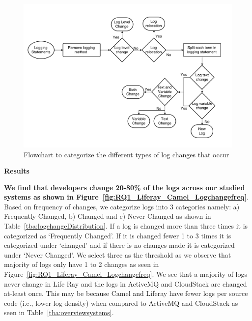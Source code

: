 \begin{figure}[tb]
	\centering
	\includegraphics[width=0.75\linewidth]{Flowchart2}
	\caption{Flowchart to categorize the different types of log changes that occur}
	\label{fig:Flowchart2}
\end{figure}



\noindent \textbf{Results}

\textbf{We find that developers change 20-80\% of the logs across our studied systems as shown in Figure~\ref{fig:RQ1_Liferay_Camel_Logchangefreq}}. Based on frequency of changes, we categorize logs into 3 categories namely: a) Frequently Changed, b) Changed and c) Never Changed as shown in Table~\ref{tba:logchangeDistribution}. If a log is changed more than three times it is categorized as `Frequently Changed'. If it is changed fewer 1 to 3 times it is categorized under `changed' and if there is no changes made it is categorized under `Never Changed'. We select three as the threshold as we observe that majority of logs only have 1 to 2 changes as seen in Figure~\ref{fig:RQ1_Liferay_Camel_Logchangefreq}. We see that a majority of logs never change in Life Ray and the logs in ActiveMQ and CloudStack are changed at-least once. This may be because Camel and Liferay have fewer logs per source code (i.e., lower log density) when compared to ActiveMQ and CloudStack as seen in Table~\ref{tba:overviewsystems}. 



